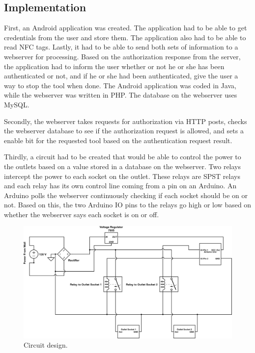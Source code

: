 \documentclass{sigchi}
\begin{document}
\subsection{Implementation}
First, an Android application was created. The application had to be able to get credentials from the user and store them. The application also had to be able to read NFC tags. Lastly, it had to be able to send both sets of information to a webserver for processing. Based on the authorization response from the server, the application had to inform the user whether or not he or she has been authenticated or not, and if he or she had been authenticated, give the user a way to stop the tool when done. The Android application was coded in Java, while the webserver was written in PHP. The database on the webserver uses MySQL.

Secondly, the webserver takes requests for authorization via HTTP posts, checks the webserver database to see if the authorization request is allowed, and sets a enable bit for the requested tool based on the authentication request result. 

Thirdly, a circuit had to be created that would be able to control the power to the outlets based on a value stored in a database on the webserver. Two relays intercept  the power to each socket on the outlet. These relays are SPST relays and each relay has its own control line coming from a pin on an Arduino. An Arduino polls the webserver continuously checking if each socket should be on or not. Based on this, the two Arduino IO pins to the relays go high or low based on whether the webserver says each socket is on or off. 

\begin{figure}[!h]
\centering
\includegraphics[width=0.9\columnwidth]{circuit}
\caption{Circuit design.}
\label{fig:circuit}
\end{figure}
\end{document}
